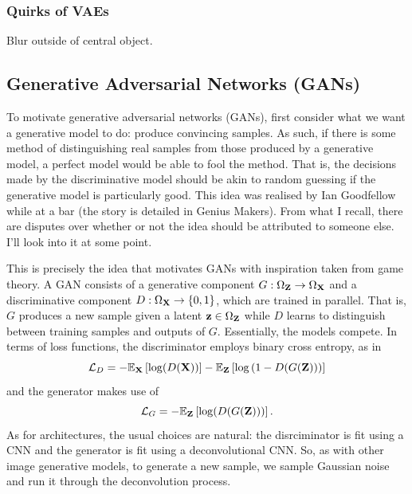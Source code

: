\documentclass[11pt]{article}
\begin{document}

\subsubsection{Quirks of VAEs}
Blur outside of central object.

\subsection{\IMPROVE Generative Adversarial Networks (GANs)}
To motivate generative adversarial networks (GANs), first consider what we want a generative model to do: produce convincing samples. As such, if there is some method of distinguishing real samples from those produced by a generative model, a perfect model would be able to fool the method. That is, the decisions made by the discriminative model should be akin to random guessing if the generative model is particularly good. This idea was realised by Ian Goodfellow while at a bar (the story is detailed in Genius Makers). From what I recall, there are disputes over whether or not the idea should be attributed to someone else. I'll look into it at some point.

This is precisely the idea that motivates GANs with inspiration taken from game theory. A GAN consists of a generative component $G:\Omega_{\mathbf{Z}}\to\Omega_{\mathbf{X}}$ and a discriminative component $D:\Omega_{\mathbf{X}}\to\{0,1\}$, which are trained in parallel. That is, $G$ produces a new sample given a latent $\mathbf{z}\in\Omega_{\mathbf{Z}}$ while $D$ learns to distinguish between training samples and outputs of $G$. Essentially, the models compete. In terms of loss functions, the discriminator employs binary cross entropy, as in
$$
\mathcal{L}_D
=
-\mathbb{E}_{\mathbf{X}}\left[\log(D(\mathbf{X}))\right]-\mathbb{E}_{\mathbf{Z}}\left[\log\left(1-D(G(\mathbf{Z}))\right)\right]
$$
and the generator makes use of
$$
\mathcal{L}_G
=
-\mathbb{E}_{\mathbf{Z}}\left[\log(D(G(\mathbf{Z})))\right].
$$
As for architectures, the usual choices are natural: the disrciminator is fit using a CNN and the generator is fit using a deconvolutional CNN. So, as with other image generative models, to generate a new sample, we sample Gaussian noise and run it through the deconvolution process.
\end{document}
